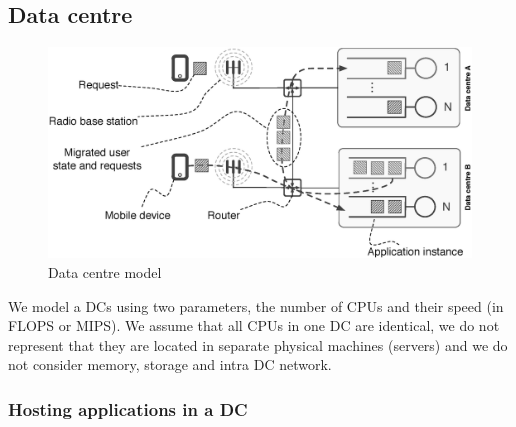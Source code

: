 \subsection{Data centre}
\begin{figure}[tb]
	\centering
	\includegraphics[width=0.8\linewidth]{fig_dc_model_horizontal.eps} 
	\caption{Data centre model}
	\label{fig:dc_model}
\end{figure}

We model a \ac{DC}s using two parameters, the number of CPUs and their speed (in FLOPS or MIPS).
We assume that all CPUs in one \ac{DC} are identical, we do not represent that they are located in separate physical machines (servers) and we do not consider memory, storage and intra \ac{DC} network.



\subsubsection{Hosting applications in a \ac{DC}}

